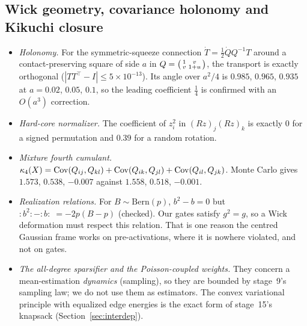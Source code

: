 \subsection{Wick geometry, covariance holonomy and Kikuchi closure}
\begin{itemize}[leftmargin=*]
\item \emph{Holonomy.} For the symmetric-squeeze connection $\dot T=\frac12\dot QQ^{-1}T$ around a contact-preserving square of side $a$ in
$Q=\begin{psmallmatrix}1&v\\v&1+u\end{psmallmatrix}$, the transport is exactly orthogonal ($|TT^\top-I|\le5\times10^{-13}$). Its angle over $a^2/4$ is
$0.985$, $0.965$, $0.935$ at $a=0.02$, $0.05$, $0.1$, so the leading coefficient $\frac14$ is confirmed with an $O(a^3)$ correction.
\item \emph{Hard-core normalizer.} The coefficient of $z_i^2$ in $(Rz)_j(Rz)_k$ is exactly $0$ for a signed permutation and $0.39$ for a
random rotation.
\item \emph{Mixture fourth cumulant.} $\kappa_4(X)=\operatorname{Cov}(Q_{ij},Q_{kl})+\operatorname{Cov}(Q_{ik},Q_{jl})+\operatorname{Cov}(Q_{il},Q_{jk})$. Monte Carlo gives $1.573$, $0.538$,
$-0.007$ against $1.558$, $0.518$, $-0.001$.
\item \emph{Realization relations.} For $B\sim\mathrm{Bern}(p)$, $b^2-b=0$ but $:\!b^2\!:-:\!b\!:\;=-2p(B-p)$ (checked). Our gates satisfy $g^2=g$, so
a Wick deformation must respect this relation. That is one reason the centred Gaussian frame works on pre-activations, where it is
nowhere violated, and not on gates.
\item \emph{The all-degree sparsifier and the Poisson-coupled weights.} They concern a mean-estimation \emph{dynamics} (sampling), so they
are bounded by stage~9's sampling law; we do not use them as estimators. The convex variational principle with equalized edge energies is
the exact form of stage~15's knapsack (Section~\ref{sec:interdep}).
\end{itemize}
